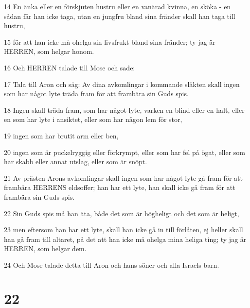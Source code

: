 \par 14 En änka eller en förskjuten hustru eller en vanärad kvinna, en sköka - en sådan får han icke taga, utan en jungfru bland sina fränder skall han taga till hustru,
\par 15 för att han icke må ohelga sin livsfrukt bland sina fränder; ty jag är HERREN, som helgar honom.
\par 16 Och HERREN talade till Mose och sade:
\par 17 Tala till Aron och säg: Av dina avkomlingar i kommande släkten skall ingen som har något lyte träda fram för att frambära sin Guds spis.
\par 18 Ingen skall träda fram, som har något lyte, varken en blind eller en halt, eller en som har lyte i ansiktet, eller som har någon lem för stor,
\par 19 ingen som har brutit arm eller ben,
\par 20 ingen som är puckelryggig eller förkrympt, eller som har fel på ögat, eller som har skabb eller annat utslag, eller som är snöpt.
\par 21 Av prästen Arons avkomlingar skall ingen som har något lyte gå fram för att frambära HERRENS eldsoffer; han har ett lyte, han skall icke gå fram för att frambära sin Guds spis.
\par 22 Sin Guds spis må han äta, både det som är högheligt och det som är heligt,
\par 23 men eftersom han har ett lyte, skall han icke gå in till förlåten, ej heller skall han gå fram till altaret, på det att han icke må ohelga mina heliga ting; ty jag är HERREN, som helgar dem.
\par 24 Och Mose talade detta till Aron och hans söner och alla Israels barn.

\chapter{22}

